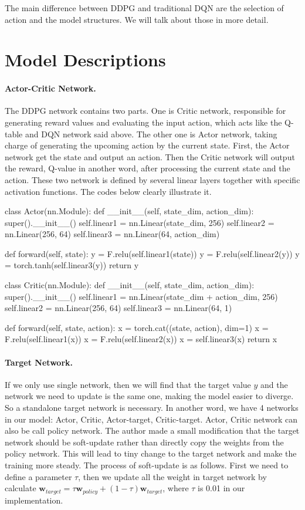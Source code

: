 \documentclass[a4paper,12pt,oneside,article]{memoir}
\newcommand{\mybold}[1]{\paragraph{#1.}} %
\begin{document}
The main difference between DDPG and traditional DQN are the selection of action and the model structures. We will talk about those in more detail.

\section{Model Descriptions}
\mybold{Actor-Critic Network}
The DDPG network contains two parts. One is Critic network, responsible for generating reward values and evaluating the input action, which acts like the Q-table and DQN network said above. The other one is Actor network, taking charge of generating the upcoming action by the current state. First, the Actor network get the state and output an action. Then the Critic network will output the reward, Q-value in another word, after processing the current state and the action. These two network is defined by several linear layers together with specific activation functions. The codes below clearly illustrate it.

\begin{python}
class Actor(nn.Module):
    def __init__(self, state_dim, action_dim):
        super().__init__()
        self.linear1 = nn.Linear(state_dim, 256)
        self.linear2 = nn.Linear(256, 64)
        self.linear3 = nn.Linear(64, action_dim)

    def forward(self, state):
        y = F.relu(self.linear1(state))
        y = F.relu(self.linear2(y))
        y = torch.tanh(self.linear3(y))
        return y

class Critic(nn.Module):
    def __init__(self, state_dim, action_dim):
        super().__init__()
        self.linear1 = nn.Linear(state_dim + action_dim, 256)
        self.linear2 = nn.Linear(256, 64)
        self.linear3 = nn.Linear(64, 1)

    def forward(self, state, action):
        x = torch.cat((state, action), dim=1)
        x = F.relu(self.linear1(x))
        x = F.relu(self.linear2(x))
        x = self.linear3(x)
        return x
\end{python}

\mybold{Target Network}
If we only use single network, then we will find that the target value $y$ and the network we need to update is the same one, making the model easier to diverge. So a standalone target network is necessary. In another word, we have 4 networks in our model: Actor, Critic, Actor-target, Critic-target. Actor, Critic network can also be call policy network. The author made a small modification that the target network should be soft-update rather than directly copy the weights from the policy network. This will lead to tiny change to the target network and make the training more steady. The process of soft-update is as follows. First we need to define a parameter $\tau$, then we update all the weight in target network by calculate $\bm{w}_{target} = \tau \bm{w}_{policy} + (1 - \tau) \bm{w}_{target}$, where $\tau$ is 0.01 in our implementation.
\end{document}

